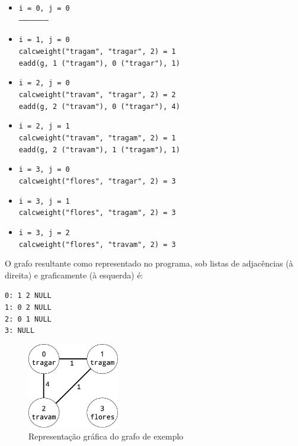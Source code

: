 \documentclass[a4paper, 18pt]{article}
\newcommand\tu[0]{\textunderscore}
\begin{document}
	\begin{itemize}
		\item
			\texttt{i = 0, j = 0} \\
			\texttt{---------------------}
		\item
			\texttt{i = 1, j = 0} \\
			\texttt{calc\tu weight("tragam", "tragar", 2) = 1} \\
			\texttt{e\tu add(g, 1 ("tragam"), 0 ("tragar"), 1)}
		\item
			\texttt{i = 2, j = 0} \\
			\texttt{calc\tu weight("travam", "tragar", 2) = 2} \\
			\texttt{e\tu add(g, 2 ("travam"), 0 ("tragar"), 4)}
		\item
			\texttt{i = 2, j = 1} \\
			\texttt{calc\tu weight("travam", "tragam", 2) = 1} \\
			\texttt{e\tu add(g, 2 ("travam"), 1 ("tragam"), 1)}
		\item
			\texttt{i = 3, j = 0} \\
			\texttt{calc\tu weight("flores", "tragar", 2) = 3}
		\item
			\texttt{i = 3, j = 1} \\
			\texttt{calc\tu weight("flores", "tragam", 2) = 3}
		\item
			\texttt{i = 3, j = 2} \\
			\texttt{calc\tu weight("flores", "travam", 2) = 3}
	\end{itemize}
	\par
	O grafo resultante como representado no programa, sob listas de adjacências (à direita) e graficamente (à esquerda) é: \\
	\begin{minipage}{\linewidth}
		\centering
		\begin{minipage}{0.45\linewidth}
		\begin{center}
			\texttt{0: 1 \textrightarrow{} 2 \textrightarrow{} NULL \\
					1: 0 \textrightarrow{} 2 \textrightarrow{} NULL \\
					2: 0 \textrightarrow{} 1 \textrightarrow{} NULL \\
					3: NULL}
		\end{center}
		\end{minipage}
		\hspace{0.05\linewidth}
		\begin{minipage}{0.45\linewidth}
			\begin{figure}[H]
				\centering
				\includegraphics[width=4cm]{graph}
				\caption{Representação gráfica do grafo de exemplo}
			\end{figure}
		\end{minipage}
	\end{minipage} \\
\end{document}
